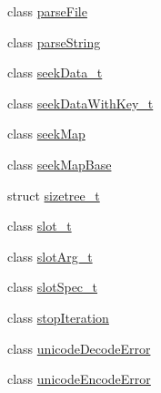 \begin{DoxyCompactItemize}
class \mbox{\hyperlink{classebml_1_1parseFile}{parse\+File}}
\item 
class \mbox{\hyperlink{classebml_1_1parseString}{parse\+String}}
\item 
class \mbox{\hyperlink{classebml_1_1seekData__t}{seek\+Data\+\_\+t}}
\item 
class \mbox{\hyperlink{classebml_1_1seekDataWithKey__t}{seek\+Data\+With\+Key\+\_\+t}}
\item 
class \mbox{\hyperlink{classebml_1_1seekMap}{seek\+Map}}
\item 
class \mbox{\hyperlink{classebml_1_1seekMapBase}{seek\+Map\+Base}}
\item 
struct \mbox{\hyperlink{structebml_1_1sizetree__t}{sizetree\+\_\+t}}
\item 
class \mbox{\hyperlink{classebml_1_1slot__t}{slot\+\_\+t}}
\item 
class \mbox{\hyperlink{classebml_1_1slotArg__t}{slot\+Arg\+\_\+t}}
\item 
class \mbox{\hyperlink{classebml_1_1slotSpec__t}{slot\+Spec\+\_\+t}}
\item 
class \mbox{\hyperlink{classebml_1_1stopIteration}{stop\+Iteration}}
\item 
class \mbox{\hyperlink{classebml_1_1unicodeDecodeError}{unicode\+Decode\+Error}}
\item 
class \mbox{\hyperlink{classebml_1_1unicodeEncodeError}{unicode\+Encode\+Error}}
\end{DoxyCompactItemize}
